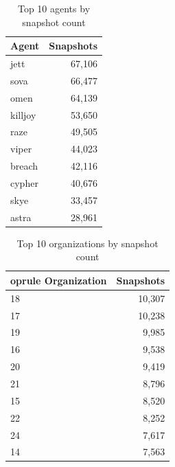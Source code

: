 \documentclass[11pt]{article}
\begin{document}
\begin{table}[H]
  \centering
  \caption{Top 10 agents by snapshot count}
  \label{tab:top-agents}
  \begin{tabular}{lr}
  \toprule
    Agent & Snapshots \\
    \midrule
    jett & 67{,}106 \\
    sova & 66{,}477 \\
    omen & 64{,}139 \\
    killjoy & 53{,}650 \\
    raze & 49{,}505 \\
    viper & 44{,}023 \\
    breach & 42{,}116 \\
    cypher & 40{,}676 \\
    skye & 33{,}457 \\
    astra & 28{,}961 \\
    \bottomrule
  \end{tabular}
\end{table}

\begin{table}[H]
  \centering
  \caption{Top 10 organizations by snapshot count}
  \label{tab:top-orgs}
  \begin{tabular}{lr}
    	oprule
    Organization & Snapshots \\
    \midrule
    18 & 10{,}307 \\
    17 & 10{,}238 \\
    19 & 9{,}985 \\
    16 & 9{,}538 \\
    20 & 9{,}419 \\
    21 & 8{,}796 \\
    15 & 8{,}520 \\
    22 & 8{,}252 \\
    24 & 7{,}617 \\
    14 & 7{,}563 \\
    \bottomrule
  \end{tabular}
\end{table}
\end{document}
